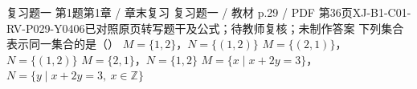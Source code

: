 \par\noindent\begin{minipage}{\linewidth}
\begin{bankitem}{复习题一 第1题}{第1章 / 章末复习 复习题一 / 教材 p.29 / PDF 第36页}{XJ-B1-C01-RV-P029-Y0406}{已对照原页转写题干及公式；待教师复核；未制作答案}
下列集合表示同一集合的是（\quad）
$M=\{1,2\}$，$N=\{(1,2)\}$
$M=\{(2,1)\}$，$N=\{(1,2)\}$
$M=\{2,1\}$，$N=\{1,2\}$
$M=\{x\mid x+2y=3\}$，$N=\{y\mid x+2y=3,\ x\in\mathbb Z\}$
\end{bankitem}
\end{minipage}\par\medskip
